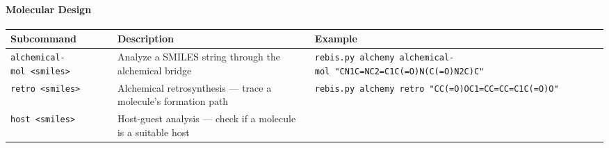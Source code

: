 \documentclass[12pt,a4paper]{article}
\begin{document}
\hypertarget{molecular-design}{%
\paragraph{Molecular Design}\label{molecular-design}}

\begin{longtable}[]{@{}lll@{}}
\toprule
\begin{minipage}[b]{0.32\columnwidth}\raggedright
Subcommand\strut
\end{minipage} & \begin{minipage}[b]{0.35\columnwidth}\raggedright
Description\strut
\end{minipage} & \begin{minipage}[b]{0.24\columnwidth}\raggedright
Example\strut
\end{minipage}\tabularnewline
\midrule
\endhead
\begin{minipage}[t]{0.32\columnwidth}\raggedright
\texttt{alchemical-mol\ \textless{}smiles\textgreater{}}\strut
\end{minipage} & \begin{minipage}[t]{0.35\columnwidth}\raggedright
Analyze a SMILES string through the alchemical bridge\strut
\end{minipage} & \begin{minipage}[t]{0.24\columnwidth}\raggedright
\texttt{rebis.py\ alchemy\ alchemical-mol\ "CN1C=NC2=C1C(=O)N(C(=O)N2C)C"}\strut
\end{minipage}\tabularnewline
\begin{minipage}[t]{0.32\columnwidth}\raggedright
\texttt{retro\ \textless{}smiles\textgreater{}}\strut
\end{minipage} & \begin{minipage}[t]{0.35\columnwidth}\raggedright
Alchemical retrosynthesis --- trace a molecule's formation path\strut
\end{minipage} & \begin{minipage}[t]{0.24\columnwidth}\raggedright
\texttt{rebis.py\ alchemy\ retro\ "CC(=O)OC1=CC=CC=C1C(=O)O"}\strut
\end{minipage}\tabularnewline
\begin{minipage}[t]{0.32\columnwidth}\raggedright
\texttt{host\ \textless{}smiles\textgreater{}}\strut
\end{minipage} & \begin{minipage}[t]{0.35\columnwidth}\raggedright
Host-guest analysis --- check if a molecule is a suitable host\strut
\end{minipage} & \begin{minipage}[t]{0.24\columnwidth}\raggedright

\end{minipage}
\end{longtable}
\end{document}

